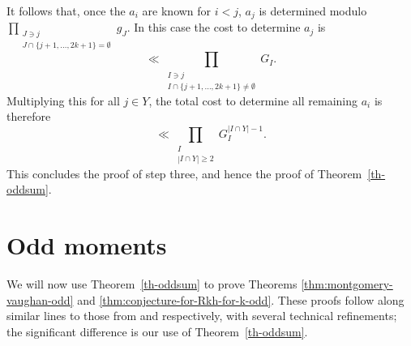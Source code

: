 \documentclass[11pt,letterpaper]{amsart}
\theoremstyle{definition}
\begin{document}
It follows that, once the $a_i$ are known for $i < j$, $a_j$ is determined modulo $\prod_{\substack{J \ni j \\ J \cap \{j+1, \ldots,2k+1\}=\emptyset}}g_J$. In this case the cost to determine $a_j$ is 
\begin{equation*}
    \ll \prod_{\substack{I \ni j \\ I \cap \{j+1, \ldots, 2k+1\}\neq \emptyset}} G_I.
\end{equation*}
Multiplying this for all $j \in Y$, the total cost to determine all remaining $a_i$ is therefore
\begin{equation*}
    \ll \prod_{\substack{I \\ |I \cap Y| \ge 2}} G_I^{|I \cap Y| - 1}.
\end{equation*}
This concludes the proof of step three, and hence the proof of Theorem~\ref{th-oddsum}.

\section{Odd moments}\label{sec-apps}
We will now use Theorem~\ref{th-oddsum} to prove Theorems \ref{thm:montgomery-vaughan-odd} and \ref{thm:conjecture-for-Rkh-for-k-odd}. These proofs follow along similar lines to those from \cite{MV86} and \cite{MS04} respectively, with several technical refinements; the significant difference is our use of Theorem~\ref{th-oddsum}. 
\end{document}
